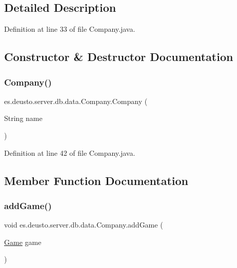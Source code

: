 \subsection{Detailed Description}


Definition at line 33 of file Company.\+java.



\subsection{Constructor \& Destructor Documentation}
\mbox{\label{classes_1_1deusto_1_1server_1_1db_1_1data_1_1_company_acdee89103d4e157b7d4016fd8cd26d5e}} 
\subsubsection{\texorpdfstring{Company()}{Company()}}
{\footnotesize\ttfamily es.\+deusto.\+server.\+db.\+data.\+Company.\+Company (\begin{DoxyParamCaption}\item[{String}]{name }\end{DoxyParamCaption})}



Definition at line 42 of file Company.\+java.



\subsection{Member Function Documentation}
\mbox{\label{classes_1_1deusto_1_1server_1_1db_1_1data_1_1_company_a99f3f91509e0a1ff5fc4d4d6a6219e77}} 
\subsubsection{\texorpdfstring{add\+Game()}{addGame()}}
{\footnotesize\ttfamily void es.\+deusto.\+server.\+db.\+data.\+Company.\+add\+Game (\begin{DoxyParamCaption}\item[{\hyperlink{classes_1_1deusto_1_1server_1_1db_1_1data_1_1_game}{Game}}]{game }\end{DoxyParamCaption})}



